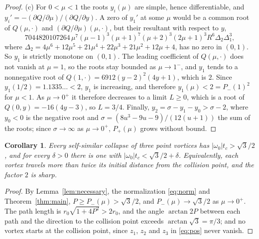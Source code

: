 \documentclass[11pt]{article}
\newtheorem{corollary}{Corollary}
\theoremstyle{definition}
\begin{document}
\begin{proof}
(c) For $0 < \mu < 1$ the roots $y_i(\mu)$ are simple, hence differentiable, and $y_i' = -(\partial Q/\partial\mu)/(\partial Q/\partial y)$. A zero of $y_1'$ at some $\mu$ would be a common root of $Q(\mu, \cdot)$ and $(\partial Q/\partial\mu)(\mu, \cdot)$, but their resultant with respect to $y$,
\[
  7044820107264\, \mu^7 (\mu - 1)^3 (\mu + 1)^7 (\mu + 2)^3 (2\mu + 1)^3 R^6 \Delta_2 \Delta_1^3,
\]
where $\Delta_2 = 4\mu^6 + 12\mu^5 + 21\mu^4 + 22\mu^3 + 21\mu^2 + 12\mu + 4$, has no zero in $(0, 1)$. So $y_1$ is strictly monotone on $(0, 1)$. The leading coefficient of $Q(\mu, \cdot)$ does not vanish at $\mu = 1$, so the roots stay bounded as $\mu \to 1^-$, and $y_1$ tends to a nonnegative root of $Q(1, \cdot) = 6912 (y - 2)^2 (4y + 1)$, which is $2$. Since $y_1(1/2) = 1.1335\ldots < 2$, $y_1$ is increasing, and therefore $y_1(\mu) < 2 = P_-(1)^2$ for $\mu < 1$. As $\mu \to 0^+$ it therefore decreases to a limit $L \ge 0$, which is a root of $Q(0, y) = -16(4y - 3)$, so $L = 3/4$. Finally, $y_2 = \sigma - y_1 - y_0 > \sigma - 2$, where $y_0 < 0$ is the negative root and $\sigma = (8u^3 - 9u - 9)/(12(u + 1))$ the sum of the roots; since $\sigma \to \infty$ as $\mu \to 0^+$, $P_+(\mu)$ grows without bound.
\end{proof}

\begin{corollary}\label{cor:bound}
Every self-similar collapse of three point vortices has $|\omega_0| t_c > \sqrt{3}/2$, and for every $\delta > 0$ there is one with $|\omega_0| t_c < \sqrt{3}/2 + \delta$. Equivalently, each vortex travels more than twice its initial distance from the collision point, and the factor $2$ is sharp.
\end{corollary}

\begin{proof}
By Lemma~\ref{lem:necessary}, the normalization \eqref{eq:norm} and Theorem~\ref{thm:main}, $P \ge P_-(\mu) > \sqrt{3}/2$, and $P_-(\mu) \to \sqrt{3}/2$ as $\mu \to 0^+$. The path length is $r_0\sqrt{1 + 4P^2} > 2r_0$, and the angle $\arctan 2P$ between each path and the direction to the collision point exceeds $\arctan\sqrt{3} = \pi/3$; and no vortex starts at the collision point, since $z_1$, $z_2$ and $z_3$ in \eqref{eq:pos} never vanish.
\end{proof}
\end{document}
